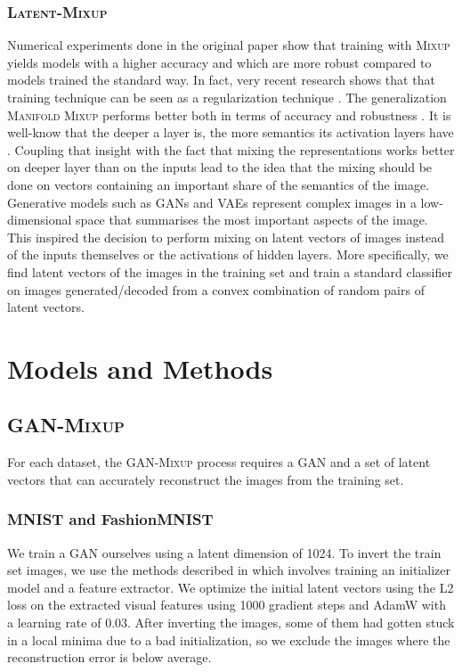 \documentclass[nohyperref]{article}
\theoremstyle{plain}
\theoremstyle{definition}
\theoremstyle{remark}
\begin{document}
\subsubsection{\textsc{Latent-Mixup}}
Numerical experiments done in the original paper show that training with \textsc{Mixup} yields models with a higher accuracy and which are more robust compared to models trained the standard way. In fact, very recent research shows that that training technique can be seen as a regularization technique \cite{mixup_reg}. The generalization \textsc{Manifold Mixup} performs better both in terms of accuracy and robustness \cite{mixup2}. It is well-know that the deeper a layer is, the more semantics its activation layers have \cite{visualizing}. Coupling that insight with the fact that mixing the representations works better on deeper layer than on the inputs lead to the idea that the mixing should be done on vectors containing an important share of the semantics of the image. Generative models such as GANs \cite{gan} and VAEs \cite{VAE} represent complex images in a low-dimensional space that summarises the most important aspects of the image. This inspired the decision to perform mixing on latent vectors of images instead of the inputs themselves or the activations of hidden layers. More specifically, we find latent vectors of the images in the training set and train a standard classifier on images generated/decoded from a convex combination of random pairs of latent vectors.

\section{Models and Methods}
\subsection{\textsc{GAN-Mixup}}
For each dataset, the \textsc{GAN-Mixup} process requires a GAN and a set of latent vectors that can accurately reconstruct the images from the training set.

\subsubsection{MNIST and FashionMNIST}
We train a GAN ourselves using a latent dimension of 1024. To invert the train set images, we use the methods described in \cite{ytLatentVector} which involves training an initializer model and a feature extractor. We optimize the initial latent vectors  using the L2 loss on the extracted visual features using 1000 gradient steps and AdamW \cite{ADAMW} with a learning rate of 0.03. After inverting the images, some of them had gotten stuck in a local minima due to a bad initialization, so we exclude the images where the reconstruction error is below average.
\end{document}
